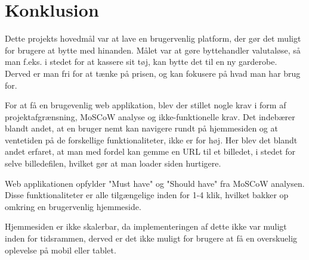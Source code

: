 \chapter{Konklusion}
Dette projekts hovedmål var at lave en brugervenlig platform, der gør det muligt for brugere at bytte med hinanden. Målet  var at gøre byttehandler valutaløse, så man f.eks. i stedet for at kassere sit tøj, kan bytte det til en ny garderobe. Derved er man fri for at tænke på prisen, og  kan fokusere på hvad man har brug for.

For at få en brugevenlig web applikation, blev der stillet nogle krav i form af projektafgrænsning, MoSCoW analyse og ikke-funktionelle krav. Det indebærer blandt andet, at en bruger nemt kan navigere rundt på hjemmesiden og at ventetiden på de forskellige funktionaliteter, ikke er for høj. Her blev det blandt andet erfaret, at man med fordel kan gemme en URL til et billedet, i stedet for selve billedefilen, hvilket gør at man loader siden hurtigere. 

Web applikationen opfylder "Must have" og "Should have" fra MoSCoW analysen. Disse funktionaliteter er alle tilgængelige inden for 1-4 klik, hvilket bakker op omkring en brugervenlig hjemmeside.

Hjemmesiden er ikke skalerbar, da implementeringen af dette ikke var muligt inden for tidsrammen, derved er det ikke muligt for brugere at få en overskuelig oplevelse på mobil eller tablet.
